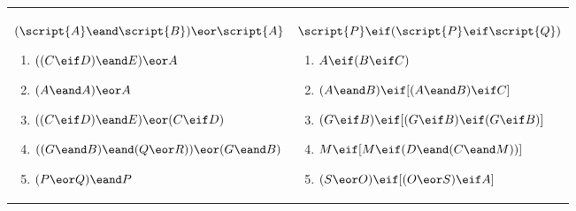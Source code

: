\begin{exercises}
\begin{longtabu}{X[1,p,m]X[1,p,m]}
\\

\item $(\script{A} \eand \script{B}) \eor \script{A}$							
	\begin{flushleft}
	\begin{enumerate}[label=\alph*.]
	\item$((C \eif D) \eand E) \eor A$
	\item$(A \eand A) \eor A$
	\item$((C \eif D) \eand E) \eor (C \eif D)$
	\item$((G \eand B) \eand (Q \eor R)) \eor (G \eand B)$
	\item$(P \eor Q) \eand P$
	\end{enumerate}
	\end{flushleft}
%

&
\item $\script{P} \eif (\script{P} \eif \script{Q})$
	\begin{flushleft}
	\begin{enumerate}[label=\alph*.]
	\item $A \eif (B \eif C)$
	\item $(A \eand B) \eif [(A \eand B) \eif C]$
	\item $(G \eif B) \eif [(G \eif B) \eif (G \eif B)]$
	\item $M \eif [M \eif (D \eand (C \eand M))]$
	\item $(S \eor O) \eif [(O \eor S) \eif A]$
	\end{enumerate}
	\end{flushleft}





\end{longtabu}
\end{exercises}
